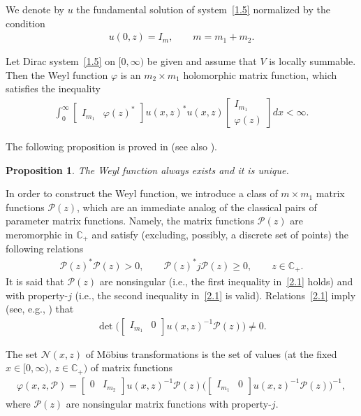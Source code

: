 \documentclass[11pt]{article}
\newtheorem{Proposition}[Theorem]{Proposition}
{\theoremstyle{definition}
\newtheorem{Definition}[Theorem]{Definition}
\newtheorem{Notation}[Theorem]{Notation}
\newtheorem{Example}[Theorem]{Example}
\newtheorem{Remark}[Theorem]{Remark}
}
\def\vp{\varphi}
\def\BC{{\mathbb C}}
\def\clp{{\mathcal P}}
\def\cln{{\mathcal N}}
\numberwithin{equation}{section}
\begin{document}
We denote by $u$ the fundamental solution of system~\eqref{1.5} normalized by
the condition
\begin{gather*}  %
u(0,z)=I_m, \qquad m=m_1+m_2.
\end{gather*}
\begin{Definition} \label{CyW2} Let Dirac system~\eqref{1.5} on $[0, \infty)$
 be given and assume that $V$ is locally summable.
Then the Weyl function $\vp$ is an $m_2 \times m_1$ holomorphic matrix function, which satisf\/ies the inequality
\begin{gather}  \label{2.0}
\int_0^{\infty}
\begin{bmatrix}
I_{m_1} & \vp(z)^*
\end{bmatrix}
u(x,z)^*u(x,z)
\begin{bmatrix}
I_{m_1} \\ \vp(z)
\end{bmatrix}dx< \infty .
\end{gather}
\end{Definition}

The following proposition is proved in \cite{FKRSp1} (see also \cite[Section~2.2]{SaSaR}).
\begin{Proposition} The Weyl function always exists and it is unique.
\end{Proposition}

In order to construct the Weyl function, we introduce a class of $m \times m_1$ matrix functions
$\clp(z)$, which are an immediate analog of the classical pairs
of parameter matrix functions. Namely, the matrix functions
$\clp(z)$ are meromorphic in $\BC_+$ and satisfy
(excluding, possibly, a discrete set of points)
the following relations
\begin{gather}\label{2.1}
\clp(z)^*\clp(z) >0, \qquad \clp(z)^* j \clp(z) \geq 0, \qquad z\in \BC_+.
\end{gather}
It is said that $\clp(z)$ are nonsingular (i.e., the f\/irst inequality in~\eqref{2.1} holds)
and with property-$j$ (i.e., the second inequality in~\eqref{2.1} is valid).
Relations~\eqref{2.1} imply (see, e.g., \cite{FKRSp1}) that
\begin{gather*}  %
\det \big(\begin{bmatrix}
I_{m_1} & 0
\end{bmatrix}u(x,z)^{-1}\clp(z)\big)\not= 0.
\end{gather*}
\begin{Definition} \label{set}
The set $\cln(x,z)$ of M\"obius transformations is the set of values $($at the f\/ixed $x \in [0, \infty)$, $z\in \BC_+)$
of matrix functions
\begin{gather*}%
\vp(x,z,\clp)=\begin{bmatrix}
0 &I_{m_2}
\end{bmatrix}u(x,z)^{-1}\clp(z)\big(\begin{bmatrix}
I_{m_1} & 0
\end{bmatrix}u(x,z)^{-1}\clp(z)\big)^{-1},
\end{gather*}
where $\clp(z)$ are nonsingular matrix functions
 with property-$j$.
 \end{Definition}
\end{document}
